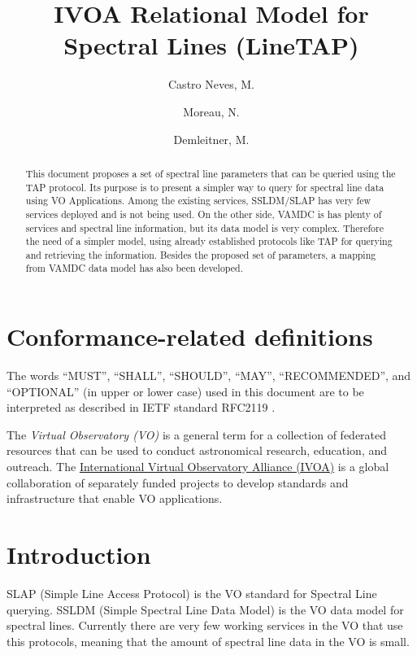 \documentclass[11pt,a4paper]{ivoa}
\title{IVOA Relational Model for Spectral Lines (LineTAP)}
\author{Castro Neves, M.}
\author{Moreau, N.}
\author{Demleitner, M.}
\begin{document}
\begin{abstract}

This document proposes a set of  spectral line parameters that can be queried using the 
TAP protocol. Its purpose is to present a simpler way to query for spectral line data using 
VO Applications. Among the existing services, SSLDM/SLAP has very few services 
deployed and is not being used. On the other side, VAMDC is has plenty of services and 
spectral line information, but its data model is very complex. Therefore the need of a 
simpler model, using already established protocols like TAP for querying and retrieving the 
information. Besides the proposed set of parameters, a mapping from VAMDC data model 
has also been developed.

\end{abstract}




\section*{Conformance-related definitions}

The words ``MUST'', ``SHALL'', ``SHOULD'', ``MAY'', ``RECOMMENDED'', and
``OPTIONAL'' (in upper or lower case) used in this document are to be
interpreted as described in IETF standard RFC2119 \citep{std:RFC2119}.

The \emph{Virtual Observatory (VO)} is a
general term for a collection of federated resources that can be used
to conduct astronomical research, education, and outreach.
The \href{http://www.ivoa.net}{International
Virtual Observatory Alliance (IVOA)} is a global
collaboration of separately funded projects to develop standards and
infrastructure that enable VO applications.


\section{Introduction}

SLAP (Simple Line Access Protocol)\citep{2010ivoa.specQ1209O} is the VO standard for 
Spectral Line querying. SSLDM (Simple Spectral Line Data 
Model)\citep{2010ivoa.spec.1209O} 
is the VO data model for spectral lines.
Currently there are very few working services in the VO that use this protocols, meaning 
that the amount of spectral line data in the VO is small. 
\end{document}
